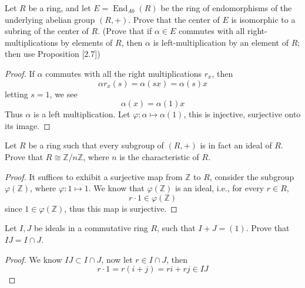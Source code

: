 \documentclass[openany]{book}
\newcommand{\Z}{\mathbb{Z}}
\begin{document}
\begin{prob}[2.17]
    Let $R$ be a ring, and let $E = \operatorname{End}_{Ab}(R)$ be the ring of endomorphisms of the underlying abelian group $(R, +)$. Prove that the center of $E$ is isomorphic to a subring of the center of $R$. (Prove that if $\alpha \in E$ commutes with all right-multiplications by elements of $R$, then $\alpha$ is left-multiplication by an element of $R$; then use Proposition [2.7])
\end{prob}
\begin{proof}
    If $\alpha$ commutes with all the right multiplications $r_x$, then 
    \begin{equation*}
        \alpha r_x(s)=\alpha(sx)=\alpha(s)x
    \end{equation*}
    letting $s=1$, we see
    \begin{equation*}
        \alpha(x)=\alpha(1)x
    \end{equation*}
    Thus $\alpha$ is a left multiplication. Let $\varphi: \alpha\mapsto\alpha(1)$, this is injective, surjective onto its image.
\end{proof}

\begin{prob}[3.4]
    Let \( R \) be a ring such that every subgroup of \( (R, +) \) is in fact an ideal of \( R \). Prove that \( R \cong \mathbb{Z}/n\mathbb{Z} \), where \( n \) is the characteristic of \( R \).
\end{prob}
\begin{proof}
    It suffices to exhibit a surjective map from $\Z$ to $R$, consider the subgroup $\varphi(\Z)$, where $\varphi: 1\mapsto 1$. We know that $\varphi(\Z)$ is an ideal, i.e., for every $r\in R$, 
    \begin{equation*}
        r\cdot 1\in\varphi(\Z)
    \end{equation*}
    since $1\in\varphi(\Z)$, thus this map is surjective.
\end{proof}


\begin{prob}[4.5]
    Let \( I, J \) be ideals in a commutative ring \( R \), such that \( I + J = (1) \). Prove that \( IJ = I \cap J \).
\end{prob}
\begin{proof}
    We know $IJ\subset I\cap J$, now let $r\in I\cap J$, then
    \begin{equation*}
        r\cdot 1=r(i+j)=ri+rj\in IJ
    \end{equation*} 
\end{proof}
\end{document}
